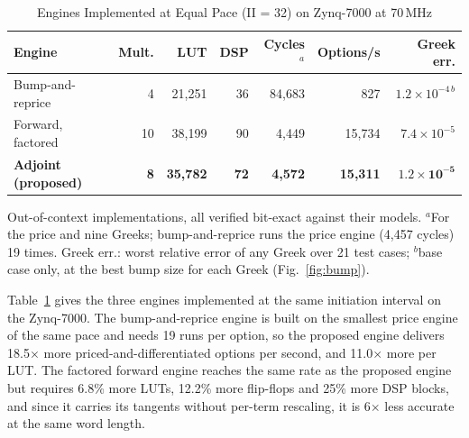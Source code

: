 \documentclass[conference]{IEEEtran}
\begin{document}
\begin{table}[!t]
\centering
\caption{Engines Implemented at Equal Pace (II = 32) on Zynq-7000 at 70\,MHz}
\label{tab:equal}
\footnotesize
\setlength{\tabcolsep}{2.2pt}
\begin{tabular}{@{}lrrrrrr@{}}
\toprule
\textbf{Engine} & \textbf{Mult.} & \textbf{LUT} & \textbf{DSP} & \textbf{Cycles$^{a}$} & \textbf{Options/s} & \textbf{Greek err.}\\
\midrule
Bump-and-reprice & 4 & 21,251 & 36 & 84,683 & 827 & $1.2\times10^{-4\,b}$\\
Forward, factored & 10 & 38,199 & 90 & 4,449 & 15,734 & $7.4\times10^{-5}$\\
\textbf{Adjoint (proposed)} & \textbf{8} & \textbf{35,782} & \textbf{72} & \textbf{4,572} & \textbf{15,311} & $\mathbf{1.2\times10^{-5}}$\\
\bottomrule
\end{tabular}
\par\vspace{2pt}\parbox{\columnwidth}{\scriptsize Out-of-context implementations, all verified bit-exact against their models. $^{a}$For the price and nine Greeks; bump-and-reprice runs the price engine (4,457 cycles) 19 times. Greek err.: worst relative error of any Greek over 21 test cases; $^{b}$base case only, at the best bump size for each Greek (Fig.~\ref{fig:bump}).}
\end{table}

Table~\ref{tab:equal} gives the three engines implemented at the same initiation interval on the
Zynq-7000. The bump-and-reprice engine is built on the smallest price engine of the same pace and
needs 19 runs per option, so the proposed engine delivers 18.5$\times$ more priced-and-differentiated
options per second, and 11.0$\times$ more per LUT. The factored forward engine reaches the same rate
as the proposed engine but requires 6.8\% more LUTs, 12.2\% more flip-flops and 25\% more DSP
blocks, and since it carries its tangents without per-term rescaling, it is 6$\times$ less accurate
at the same word length.
\end{document}
